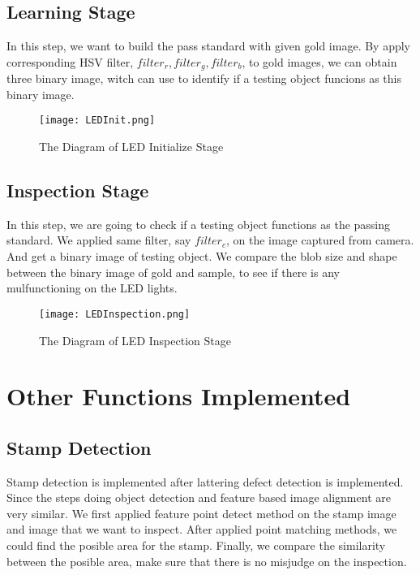 	\subsection{Learning Stage}
		In this step, we want to build the pass standard with given gold image.
		By apply corresponding HSV filter, $filter_r, filter_g, filter_b$, to gold images, we can obtain three binary image, witch can use to identify if a testing object funcions as this binary image.
		\begin{figure}[H]
			\texttt{[image: LEDInit.png]}
			\caption{The Diagram of LED Initialize Stage}
			\label{fig:LEDInit}
		\end{figure}

	\subsection{Inspection Stage}
		In this step, we are going to check if a testing object functions as the passing standard.
		We applied same filter, say $filter_c$, on the image captured from camera. And get a binary image of testing object.
		We compare the blob size and shape between the binary image of gold and sample, to see if there is any mulfunctioning on the LED lights.
		\begin{figure}[H]
			\texttt{[image: LEDInspection.png]}
			\caption{The Diagram of LED Inspection Stage}
			\label{fig:LEDInspection}
		\end{figure}

\section{Other Functions Implemented}
	\subsection{Stamp Detection}
		Stamp detection is implemented after lattering defect detection is implemented.
		Since the steps doing object detection and feature based image alignment are very similar.
		We first applied feature point detect method on the stamp image and image that we want to inspect.
		After applied point matching methods, we could find the posible area for the stamp.
		Finally, we compare the similarity between the posible area, make sure that there is no misjudge on the inspection.
